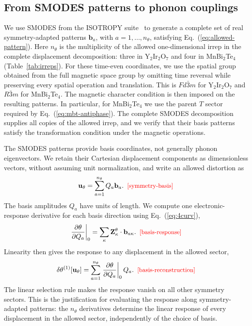 \documentclass[galley,aps,pra,10pt,amsmath,amssymb,
    superscriptaddress,nofootinbib,longbibliography]{revtex4-2}
\def\Red#1{\textcolor{red}{#1}}
\newcounter{comm}
\newcommand{\seclab}[1]{\label{sec:#1}{\Red{\small\;\;[sec:~#1]}}}
\newcommand{\eqlab}[1]{\Red{\hbox{\small\;\;[#1]}}\label{eq:#1}}
\newcommand{\eqlab}[1]{\label{eq:#1}}
\newcommand{\seclab}[1]{\label{sec:#1}}
\newcommand{\eq}[1]{Eq.~(\ref{eq:#1})}
\newcommand{\code}[1]{\textsc{#1}}
\newcommand{\MBT}{MnBi$_2$Te$_4$}
\newcommand{\YIO}{Y$_2$Ir$_2$O$_7$}
\begin{document}
\subsection{From SMODES patterns to phonon couplings}
\seclab{charges}

We use \code{SMODES} from the ISOTROPY suite~\cite{isotropy} to generate a complete set of real symmetry-adapted patterns $\mathbf b_a$, with $a=1,\ldots,n_\theta$, satisfying \eq{allowed-pattern}. Here $n_\theta$ is the multiplicity of the allowed one-dimensional irrep in the complete displacement decomposition: three in \YIO{} and four in \MBT{} (Table~\ref{tab:irreps}). For these time-even coordinates, we use the spatial group obtained from the full magnetic space group by omitting time reversal while preserving every spatial operation and translation. This is $Fd\bar3m$ for \YIO{} and $R\bar3m$ for \MBT{}. The magnetic character condition is then imposed on the resulting patterns. In particular, for \MBT{} we use the parent $T$ sector required by \eq{mbt-antiphase}. The complete \code{SMODES} decomposition supplies all copies of the allowed irrep, and we verify that their basis patterns satisfy the transformation condition under the magnetic operations.

The \code{SMODES} patterns provide basis coordinates, not generally phonon eigenvectors. We retain their Cartesian displacement components as dimensionless vectors, without assuming unit normalization, and write an allowed distortion as
\begin{equation}
\mathbf u_\theta=\sum_{a=1}^{n_\theta}Q_a\mathbf b_a.
\eqlab{symmetry-basis}
\end{equation}
The basis amplitudes $Q_a$ have units of length. We compute one electronic-response derivative for each basis direction using \eq{4curv},
\begin{equation}
\left.\frac{\partial\theta}{\partial Q_a}\right|_0
=\sum_\kappa\mathbf Z^\theta_\kappa\cdot\mathbf b_{a\kappa}.
\eqlab{basis-response}
\end{equation}
Linearity then gives the response to any displacement in the allowed sector,
\begin{equation}
\delta\theta^{(1)}[\mathbf u_\theta]
=\sum_{a=1}^{n_\theta}\left.\frac{\partial\theta}{\partial Q_a}\right|_0Q_a.
\eqlab{basis-reconstruction}
\end{equation}
The linear selection rule makes the response vanish on all other symmetry sectors. This is the justification for evaluating the response along symmetry-adapted patterns: the $n_\theta$ derivatives determine the linear response of every displacement in the allowed sector, independently of the choice of basis.
\end{document}
